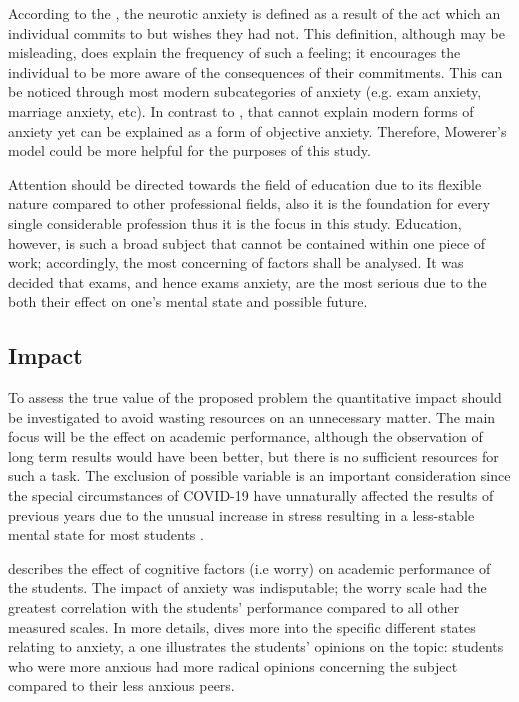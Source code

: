 \documentclass[12pt]{report}
\begin{document}
According to the \cite{mowrer1939stimulus}, the neurotic anxiety is defined as a
result of the act which an individual commits to but wishes they had not. This
definition, although may be misleading, does explain the frequency of such a
feeling; it encourages the individual to be more aware of the consequences of
their commitments. This can be noticed through most modern subcategories of
anxiety (e.g. exam anxiety, marriage anxiety, etc). In contrast to  \cite[which
suggests anxiety to be an extension of the parenting
instinct]{sullivan2013interpersonal}, that cannot explain modern forms of
anxiety yet can be explained as a form of objective anxiety. Therefore,
Mowerer's model could be more helpful for the purposes of this study.

Attention should be directed towards the field of education due to its flexible
nature compared to other professional fields, also it is the foundation for
every single considerable profession thus it is the focus in this study.
Education, however, is such a broad subject that cannot be contained within one
piece of work; accordingly, the most concerning of factors shall be analysed. It
was decided that exams, and hence exams anxiety, are the most serious due to the
both their effect on one's mental state and possible future.

\subsection{Impact}

To assess the true value of the proposed problem the quantitative impact should
be investigated to avoid wasting resources on an unnecessary matter. The main
focus will be the effect on academic performance, although the observation of
long term results would have been better, but there is no sufficient resources
for such a task. The exclusion of possible variable is an important
consideration since the special circumstances of COVID-19 have unnaturally
affected the results of previous years due to the unusual increase in stress
resulting in a less-stable mental state for most students
\parencite{covid19-impact}.

\cite{rana_2010_the} describes the effect of cognitive factors (i.e worry) on
academic performance of the students. The impact of anxiety was indisputable;
the worry scale had the greatest correlation with the students' performance
compared to all other measured scales. In more details, \cite{trifoni2011does}
dives more into the specific different states relating to anxiety, a one
illustrates the students' opinions on the topic: students who were more anxious
had more radical opinions concerning the subject compared to their less anxious
peers.
\end{document}
